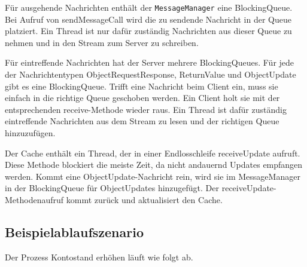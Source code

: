 Für ausgehende Nachrichten enthält der \verb|MessageManager| eine BlockingQueue. Bei Aufruf von sendMessageCall wird die zu sendende Nachricht in der Queue platziert. Ein Thread ist nur dafür zuständig Nachrichten aus dieser Queue zu nehmen und in den Stream zum Server zu schreiben.


Für eintreffende Nachrichten hat der Server mehrere BlockingQueues. Für jede der Nachrichtentypen ObjectRequestResponse, ReturnValue und ObjectUpdate gibt es eine BlockingQueue. Trifft eine Nachricht beim Client ein, muss sie einfach in die richtige Queue geschoben werden. Ein Client holt sie mit der entsprechenden receive-Methode wieder raus. Ein Thread ist dafür zuständig eintreffende Nachrichten aus dem Stream zu lesen und der richtigen Queue hinzuzufügen. 

Der Cache enthält ein Thread, der in einer Endlosschleife receiveUpdate aufruft. Diese Methode blockiert die meiste Zeit, da nicht andauernd Updates empfangen werden. Kommt eine ObjectUpdate-Nachricht rein, wird sie im MessageManager in der BlockingQueue für ObjectUpdates hinzugefügt. Der receiveUpdate-Methodenaufruf kommt zurück und aktualisiert den Cache.

\subsection{Beispielablaufszenario}
\label{sec:beisp}

Der Prozess Kontostand erhöhen läuft wie folgt ab.

